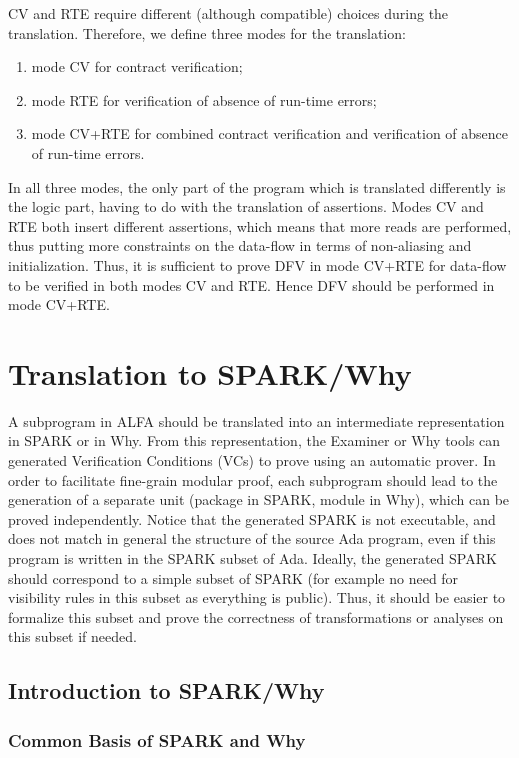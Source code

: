 \documentclass{article}
\newcounter{example}
\begin{document}
CV and RTE require different (although compatible) choices during the
translation.  Therefore, we define three modes for the translation:
\begin{enumerate}
\item mode CV for contract verification;
\item mode RTE for verification of absence of run-time errors;
\item mode CV+RTE for combined contract verification and verification of
  absence of run-time errors.
\end{enumerate}

In all three modes, the only part of the program which is translated
differently is the logic part, having to do with the translation of
assertions. Modes CV and RTE both insert different assertions, which means that
more reads are performed, thus putting more constraints on the data-flow in
terms of non-aliasing and initialization. Thus, it is sufficient to prove DFV
in mode CV+RTE for data-flow to be verified in both modes CV and RTE. Hence DFV
should be performed in mode CV+RTE.

\section{Translation to SPARK/Why}

A subprogram in ALFA should be translated into an intermediate representation
in SPARK or in Why. From this representation, the Examiner or Why tools can
generated Verification Conditions (VCs) to prove using an automatic prover.  In
order to facilitate fine-grain modular proof, each subprogram should lead to
the generation of a separate unit (package in SPARK, module in Why), which can
be proved independently. Notice that the generated SPARK is not executable, and
does not match in general the structure of the source Ada program, even if this
program is written in the SPARK subset of Ada. Ideally, the generated SPARK
should correspond to a simple subset of SPARK (for example no need for
visibility rules in this subset as everything is public). Thus, it should be
easier to formalize this subset and prove the correctness of transformations or
analyses on this subset if needed.

\subsection{Introduction to SPARK/Why}

\subsubsection{Common Basis of SPARK and Why}
\end{document}
